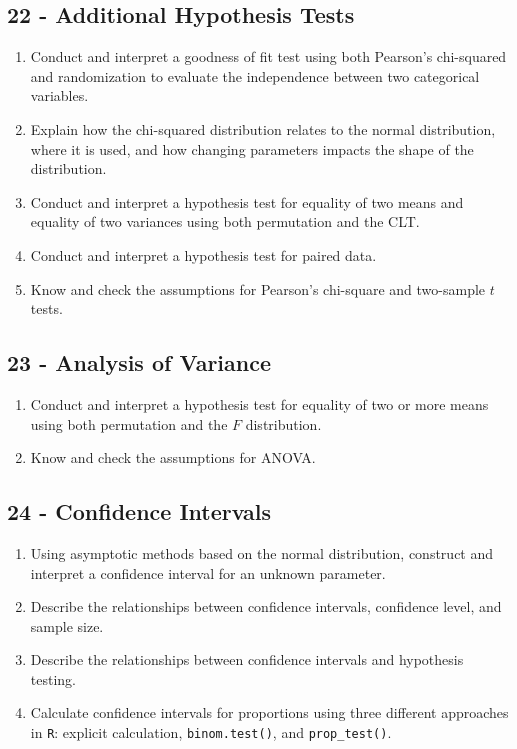 \documentclass[
  letterpaper,
  DIV=11,
  numbers=noendperiod]{scrreprt}
\begin{document}
\subsection*{22 - Additional Hypothesis
Tests}\label{additional-hypothesis-tests}

\begin{enumerate}
\def\labelenumi{\arabic{enumi})}
\item
  Conduct and interpret a goodness of fit test using both Pearson's
  chi-squared and randomization to evaluate the independence between two
  categorical variables.
\item
  Explain how the chi-squared distribution relates to the normal
  distribution, where it is used, and how changing parameters impacts
  the shape of the distribution.
\item
  Conduct and interpret a hypothesis test for equality of two means and
  equality of two variances using both permutation and the CLT.
\item
  Conduct and interpret a hypothesis test for paired data.
\item
  Know and check the assumptions for Pearson's chi-square and two-sample
  \(t\) tests.
\end{enumerate}

\subsection*{23 - Analysis of Variance}\label{analysis-of-variance}

\begin{enumerate}
\def\labelenumi{\arabic{enumi})}
\item
  Conduct and interpret a hypothesis test for equality of two or more
  means using both permutation and the \(F\) distribution.
\item
  Know and check the assumptions for ANOVA.
\end{enumerate}

\subsection*{24 - Confidence Intervals}\label{confidence-intervals}

\begin{enumerate}
\def\labelenumi{\arabic{enumi})}
\item
  Using asymptotic methods based on the normal distribution, construct
  and interpret a confidence interval for an unknown parameter.
\item
  Describe the relationships between confidence intervals, confidence
  level, and sample size.
\item
  Describe the relationships between confidence intervals and hypothesis
  testing.
\item
  Calculate confidence intervals for proportions using three different
  approaches in \texttt{R}: explicit calculation, \texttt{binom.test()},
  and \texttt{prop\_test()}.
\end{enumerate}
\end{document}

